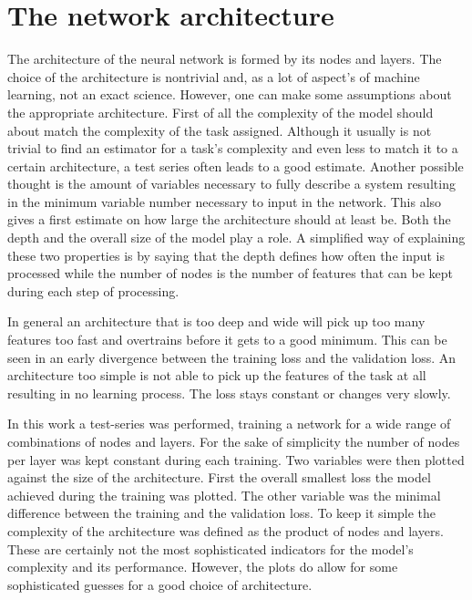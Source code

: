 \section{The network architecture}

The architecture of the neural network is formed by its nodes and layers. The choice of the architecture is nontrivial and, as a lot of aspect's of machine learning, not an exact science.
However, one can make some assumptions about the appropriate architecture.
First of all the complexity of the model should about match the complexity of the task assigned. Although it usually is not trivial to find an estimator for a task's complexity and even less to match it to a certain architecture, a test series often leads to a good estimate. Another possible thought is the amount of variables necessary to fully describe a system resulting in the minimum variable number necessary to input in the network. This also gives a first estimate on how large the architecture should at least be.
Both the depth and the overall size of the model play a role. A simplified way of explaining these two properties is by saying that the depth defines how often the input is processed while the number of nodes is the number of features that can be kept during each step of processing.

In general an architecture that is too deep and wide will pick up too many features too fast and overtrains before it gets to a good minimum. This can be seen in an early divergence between the training loss and the validation loss. An architecture too simple is not able to pick up the features of the task at all resulting in no learning process. The loss stays constant or changes very slowly.

In this work a test-series was performed, training a network for a wide range of combinations of nodes and layers. For the sake of simplicity the number of nodes per layer was kept constant during each training. Two variables were then plotted against the size of the architecture. First the overall smallest loss the model achieved during the training was plotted. The other variable was the minimal difference between the training and the validation loss. To keep it simple the complexity of the architecture was defined as the product of nodes and layers. These are certainly not the most sophisticated indicators for the model's complexity and its performance. However, the plots do allow for some sophisticated guesses for a good choice of architecture.

